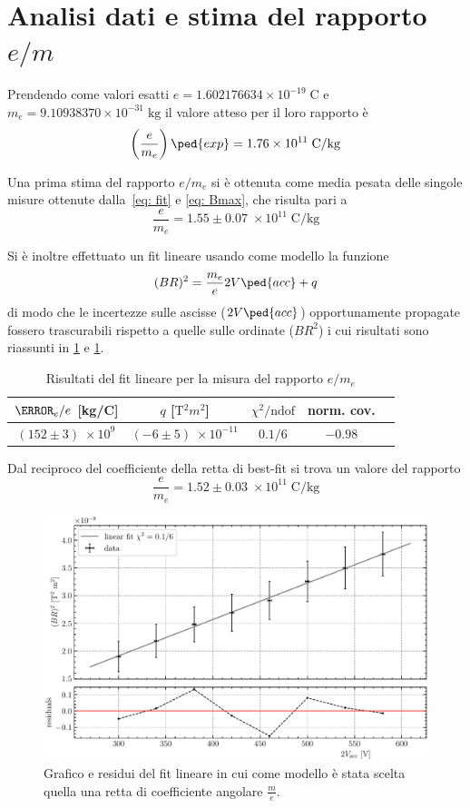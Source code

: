 \documentclass[10pt, a4paper, italian]{article}
\begin{document}
\section{Analisi dati e stima del rapporto $e/m$}
Prendendo come valori esatti $e = 1.602176634 \times 10^{-19} \; \si{\coulomb}$
e $m_{e} = 9.10938370 \times 10^{-31} \; \si{\kilogram}$ il valore atteso per
il loro rapporto è
\begin{equation}\label{eq: e-m-exp}
\left(\frac{e}{m_e}\right)\ped{exp} =
1.76 \times 10^{11}\; \si{\coulomb/\kilogram}
\end{equation}

Una prima stima del rapporto $e/m_e$ si è ottenuta come media pesata delle
singole misure ottenute dalla~\cref{eq: fit} e \cref{eq: Bmax}, che risulta
pari a
\[
\frac{e}{m_e} = 1.55 \pm 0.07 \; \times 10^{11} \; \si{\coulomb/\kilogram}
\]

Si è inoltre effettuato un fit lineare usando come modello la funzione
\[
(BR)^2 = \frac{m_e}{e} 2 V\ped{acc} + q
\]
di modo che le incertezze sulle ascisse ($2 V\ped{acc}$) opportunamente
propagate fossero trascurabili rispetto a quelle sulle ordinate (${BR}^2$)
i cui risultati sono riassunti in \cref{tab: linfit} e \cref{fig: linfit}.
\begin{table}
\centering
\begin{tabular}{ccccc}
\toprule
$\m_e/e$ [kg/C] & $q$ [$\si{\tesla^2 m^2}$] & $\chi^2/\text{ndof}$ & norm. cov. \\
\midrule
$(152 \pm 3) \; \times 10^{9}$ & $(-6 \pm 5) \; \times 10^{-11}$ &
$0.1/6$ & $-0.98$ \\
\bottomrule
\end{tabular}
\caption{Risultati del fit lineare per la misura del rapporto $e/m_e$
\label{tab: linfit}}
\end{table}

Dal reciproco del coefficiente della retta di best-fit si trova un valore del
rapporto
\[
\frac{e}{m_e} = 1.52 \pm 0.03 \; \times 10^{11} \; \si{\coulomb/\kilogram}
\]

\begin{figure}
\includegraphics[width=\textwidth]{lin}
\caption{Grafico e residui del fit lineare in cui come modello è stata scelta
quella una retta di coefficiente angolare $\frac{m}{e}$.
\label{fig: linfit}}
\end{figure}
\end{document}
